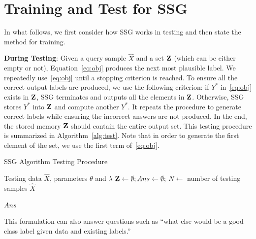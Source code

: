 \documentclass[letterpaper]{article} %
\begin{document}

\section{ Training and Test for SSG}
In what follows, we first consider how SSG works in testing and then state the method for training.

\textbf{During Testing}: Given a query sample $\hat{X}$ and a set ${\bf Z}$ (which can be either empty or not), Equation~\eqref{eq:obj} produces the next most plausible label.  We repeatedly use~\eqref{eq:obj} until a stopping criterion is reached. To ensure all the correct output labels are produced, we use the following criterion: if $Y^*$  in~\eqref{eq:obj} exists in ${\bf Z}$, SSG terminates and outputs all the elements in ${\bf Z}$. Otherwise, SSG stores $Y^*$ into ${\bf Z}$ and compute another $Y^*$. It repeats the procedure to generate correct labels while ensuring the incorrect answers are not produced. In the end, the stored memory ${\bf Z}$ should contain the entire output set. This testing procedure is summarized in Algorithm~\ref{alg:test}. Note that in order to generate the first element of the set, we use the first term of~\eqref{eq:obj}. 

\begin{algorithm}[tb]
   \caption{SSG Algorithm Testing Procedure}
   \label{alg:test}
\begin{algorithmic}
    Testing data $\hat{X}$, parameters $\theta$ and $\lambda$ 
   \STATE ${\bf Z} \leftarrow \emptyset; Ans \leftarrow \emptyset;$
   \STATE $N \leftarrow$ number of testing samples $\hat{X}$

   \ENDWHILE
   \ENDFOR
	  {$Ans$}
\end{algorithmic}
\end{algorithm}



This formulation can also answer questions such as ``what else would be a good class label given data and existing labels.'' 
\end{document}
